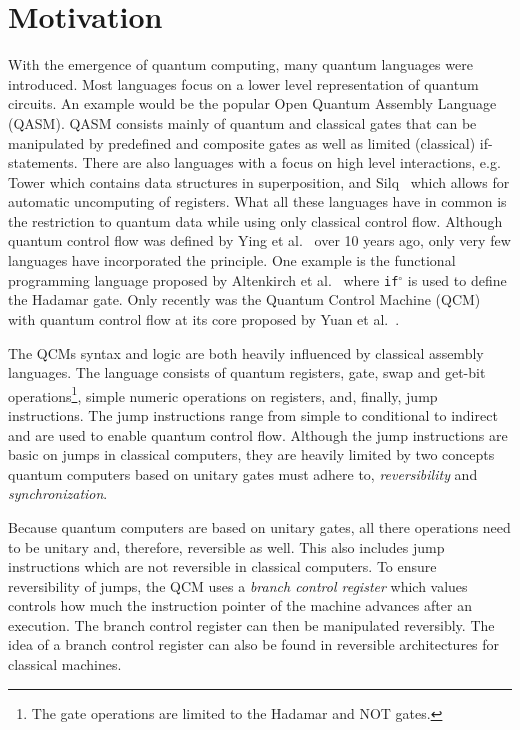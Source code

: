 \chapter{Motivation}
With the emergence of quantum computing, many quantum languages were introduced. Most languages focus on a lower level representation of quantum circuits. An example would be the popular Open Quantum Assembly Language (QASM)\cite{CBSG17}. QASM consists mainly of quantum and classical gates that can be manipulated by predefined and composite gates as well as limited (classical) if-statements. There are also languages with a focus on high level interactions, e.g. Tower\cite{ChMi22} which contains data structures in superposition, and Silq~\cite{BBGV20} which allows for automatic uncomputing of registers. What all these languages have in common is the restriction to quantum data while using only classical control flow. Although quantum control flow was defined by Ying et al.~\cite{YYF12} over 10 years ago, only very few languages have incorporated the principle. One example is the functional programming language proposed by Altenkirch et al.~\cite{AlGr05} where \texttt{if$^\circ$} is used to define the Hadamar gate. Only recently was the Quantum Control Machine (QCM) with quantum control flow at its core proposed by Yuan et al.~\cite{YVC24}. 

The QCMs syntax and logic are both heavily influenced by classical assembly languages. The language consists of quantum registers, gate, swap and get-bit operations\footnote{The gate operations are limited to the Hadamar and NOT gates.}, simple numeric operations on registers, and, finally, jump instructions. The jump instructions range from simple to conditional to indirect and are used to enable quantum control flow. Although the jump instructions are basic on jumps in classical computers, they are heavily limited by two concepts quantum computers based on unitary gates must adhere to, \emph{reversibility} and \emph{synchronization}.~\cite{YVC24}

Because quantum computers are based on unitary gates, all there operations need to be unitary and, therefore, reversible as well. This also includes jump instructions which are not reversible in classical computers. To ensure reversibility of jumps, the QCM uses a \emph{branch control register} which values controls how much the instruction pointer of the machine advances after an execution. The branch control register can then be manipulated reversibly. The idea of a branch control register can also be found in reversible architectures for classical machines\cite{AGY07, TAG12}.



